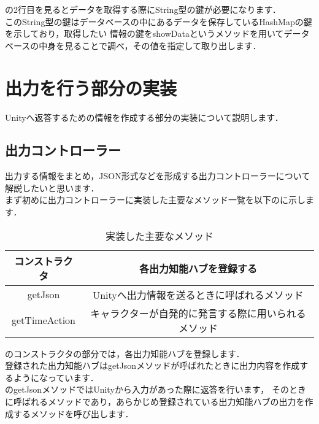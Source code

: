 の2行目を見るとデータを取得する際にString型の鍵が必要になります．
\\
このString型の鍵はデータベースの中にあるデータを保存しているHashMapの鍵を示しており，取得したい
情報の鍵をshowDataというメソッドを用いてデータベースの中身を見ることで調べ，その値を指定して取り出します．




\section{出力を行う部分の実装}
Unityへ返答するための情報を作成する部分の実装について説明します．
\\
\subsection{出力コントローラー}
出力する情報をまとめ，JSON形式などを形成する出力コントローラーについて解説したいと思います．\\
まず初めに出力コントローラーに実装した主要なメソッド一覧を以下のに示します．\\

\begin{table}[tbh]
	\caption{実装した主要なメソッド} \label{tab:OutputController}
	\begin{center}
		\begin{tabular}[htb]{c|c}
		\hline
		コンストラクタ & 各出力知能ハブを登録する \\
		\hline
		getJson & Unityへ出力情報を送るときに呼ばれるメソッド \\
		\hline
		getTimeAction & キャラクターが自発的に発言する際に用いられるメソッド \\
		\hline
		\end{tabular}
	\end{center}
\end{table}

のコンストラクタの部分では，各出力知能ハブを登録します．\\
登録された出力知能ハブはgetJsonメソッドが呼ばれたときに出力内容を作成するようになっています．\\

のgetJsonメソッドではUnityから入力があった際に返答を行います，
そのときに呼ばれるメソッドであり，あらかじめ登録されている出力知能ハブの出力を作成するメソッドを呼び出します．\\

